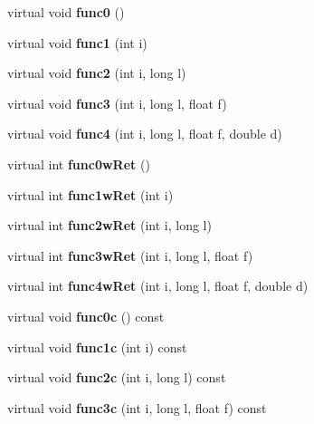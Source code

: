 \begin{DoxyCompactItemize}
\item 
virtual void {\bfseries func0} ()\label{classX_a27355c42b176deb8a2e7d553688cbd37}

\item 
virtual void {\bfseries func1} (int i)\label{classX_a73e4cd903ccca816396b9831331f9ef0}

\item 
virtual void {\bfseries func2} (int i, long l)\label{classX_ac4e3ca90c5752a234904e8dfce1b1629}

\item 
virtual void {\bfseries func3} (int i, long l, float f)\label{classX_a90a81e9a005bb57a5696194d9d5136e9}

\item 
virtual void {\bfseries func4} (int i, long l, float f, double d)\label{classX_abead6f6333d7d0e02941b4307b80a16a}

\item 
virtual int {\bfseries func0w\+Ret} ()\label{classX_ade20b62f8238100c81866c95fe327148}

\item 
virtual int {\bfseries func1w\+Ret} (int i)\label{classX_a328b3a6ef32dcb52c5259dd10a6d5006}

\item 
virtual int {\bfseries func2w\+Ret} (int i, long l)\label{classX_a36a2a3e4039f2596709eab5f361161a1}

\item 
virtual int {\bfseries func3w\+Ret} (int i, long l, float f)\label{classX_a3d7a59e0dd84e61db27aef49cad69bb4}

\item 
virtual int {\bfseries func4w\+Ret} (int i, long l, float f, double d)\label{classX_ac60b4751ddd3730f818f380dcbf7fc13}

\item 
virtual void {\bfseries func0c} () const \label{classX_adbb8d3e53d34adec9aba987174c0490e}

\item 
virtual void {\bfseries func1c} (int i) const \label{classX_a86def5723d706693f4ca3218b7476e57}

\item 
virtual void {\bfseries func2c} (int i, long l) const \label{classX_a30e5d553fe51ef698b92a83e2363d10d}

\item 
virtual void {\bfseries func3c} (int i, long l, float f) const \label{classX_a7f74b300704d2a0c08ebb8b117ffbbde}


\end{DoxyCompactItemize}
